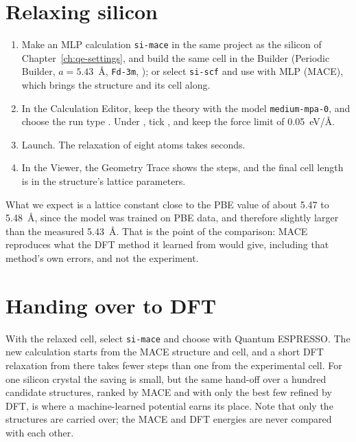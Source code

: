 \section{Relaxing silicon}
\begin{enumerate}
	\item Make an MLP calculation \texttt{si-mace} in the same project as the silicon of Chapter~\ref{ch:qe-settings}, and build the same cell in the Builder (Periodic Builder, $a = 5.43$~\AA, \texttt{Fd-3m}, ); or select \texttt{si-scf} and use  with MLP (MACE), which brings the structure and its cell along.
	\item In the Calculation Editor, keep the theory  with the model \texttt{medium-mpa-0}, and choose the run type . Under , tick , and keep the force limit of 0.05~eV/\AA.
	\item Launch. The relaxation of eight atoms takes seconds.
	\item In the Viewer, the Geometry Trace shows the steps, and the final cell length is in the structure's lattice parameters.
\end{enumerate}

What we expect is a lattice constant close to the PBE value of about 5.47 to 5.48~\AA, since the model was trained on PBE data, and therefore slightly larger than the measured 5.43~\AA. That is the point of the comparison: MACE reproduces what the DFT method it learned from would give, including that method's own errors, and not the experiment.

\section{Handing over to DFT}
With the relaxed cell, select \texttt{si-mace} and choose  with Quantum ESPRESSO. The new calculation starts from the MACE structure and cell, and a short DFT relaxation from there takes fewer steps than one from the experimental cell. For one silicon crystal the saving is small, but the same hand-off over a hundred candidate structures, ranked by MACE and with only the best few refined by DFT, is where a machine-learned potential earns its place. Note that only the structures are carried over; the MACE and DFT energies are never compared with each other.

